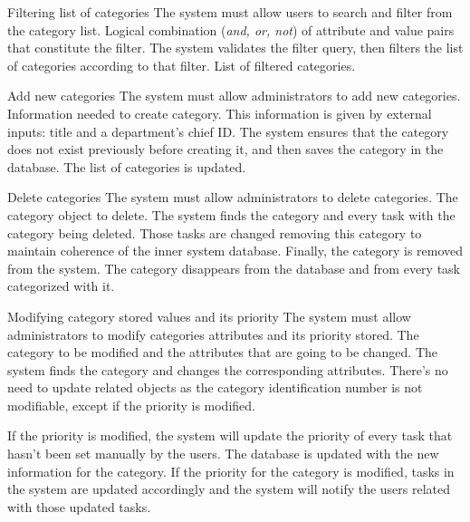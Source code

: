 \begin{requirement}{Filtering list of categories}
\reqdesc The system must allow users to search and filter from the category list.
\reqin Logical combination (\textit{and, or, not}) of attribute and value pairs that constitute the filter.
\reqsteps The system validates the filter query, then filters the list of categories according to that filter.
\reqout List of filtered categories.
\end{requirement}

\begin{requirement}{Add new categories}
\reqdesc The system must allow administrators to add new categories.
\reqin Information needed to create category. This information is given by external inputs: title and a department's chief ID.
\reqsteps The system ensures that the category does not exist previously before creating it, and then saves the category in the database.
\reqout The list of categories is updated.
\end{requirement}

\begin{requirement}{Delete categories}
\reqdesc The system must allow administrators to delete categories.
\reqin The category object to delete.
\reqsteps The system finds the category and every task with the category being deleted. Those tasks are changed removing this category to maintain coherence of the inner system database. Finally, the category is removed from the system.
\reqout The category disappears from the database and from every task categorized with it.
\end{requirement}

\begin{requirement}{Modifying category stored values and its priority}
\reqdesc The system must allow administrators to modify categories attributes and its priority stored.
\reqin The category to be modified and the attributes that are going to be changed.
\reqsteps The system finds the category and changes the corresponding attributes. There's no need to update related objects as the category identification number is not modifiable, except if the priority is modified.

If the priority is modified, the system will update the priority of every task that hasn't been set manually by the users.
\reqout The database is updated with the new information for the category. If the priority for the category is modified, tasks in the system are updated accordingly and the system will notify the users related with those updated tasks.
\end{requirement}


